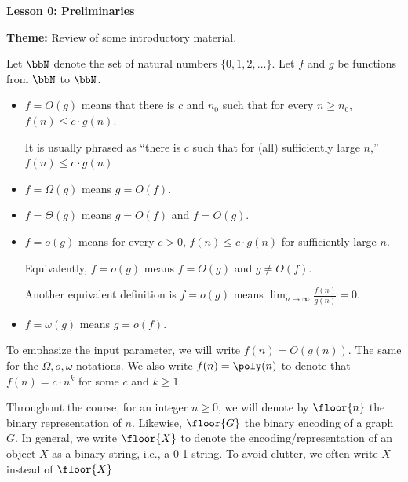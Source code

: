 \documentclass[11pt, a4paper]{article}
\renewcommand{\lesson}{0}
\renewcommand{\lessontitle}{Preliminaries}
\renewcommand{\fulltitle}{Lesson \lesson: \lessontitle}
\begin{document}
\date{}



\begin{center}
{\Large {\bf \fulltitle}}
\end{center}
\vspace{0.5cm}

\noindent
{\bf Theme:} Review of some introductory material.


\vspace{0.7cm}
\noindent
Let $\bbN$ denote the set of natural numbers $\{0,1,2,\ldots\}$.
Let $f$ and $g$ be functions from $\bbN$ to $\bbN$.
\begin{itemize}
\item
$f= O(g)$ means that there is $c$ and $n_0$
such that for every $n\geq n_0$, $f(n) \leq  c\cdot g(n)$.

It is usually phrased as ``there is $c$
such that for (all) sufficiently large $n$,'' $f(n)\leq c\cdot g(n)$.

\item
$f= \Omega(g)$ means $g=O(f)$.
\item
$f= \Theta(g)$ means $g=O(f)$ and $f=O(g)$.
\item
$f=o(g)$ means for every $c > 0$, $f(n)\leq c\cdot g(n)$ for sufficiently large $n$.

Equivalently, $f=o(g)$ means $f=O(g)$ and $g\neq O(f)$. 

Another equivalent definition is  $f=o(g)$ means $\lim_{n\to \infty} \frac{f(n)}{g(n)}=0$.

\item
$f=\omega(g)$ means $g=o(f)$.
\end{itemize}
To emphasize the input parameter, we will write $f(n)=O(g(n))$. 
The same for the $\Omega, o, \omega$ notations.
We also write $f(n)=\poly(n)$ to denote that $f(n)=c\cdot n^k$ for some $c$ and $k\geq 1$.


Throughout the course, for an integer $n\geq 0$,
we will denote by $\floor {n}$ the binary representation of $n$.
Likewise, $\floor{G}$ the binary encoding of a graph $G$.
In general, we write $\floor{X}$ to denote the encoding/representation of an object $X$
as a binary string, i.e., a 0-1 string.
To avoid clutter, we often write $X$ instead of $\floor {X}$.
\end{document}
